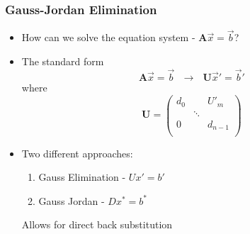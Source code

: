\documentclass[10pt]{beamer}
\begin{document}
\begin{frame}
  \frametitle{Gauss-Jordan Elimination}
  \begin{itemize}
  \item How can we solve the equation system - $\mathbf{A} \vec{x} = \vec{b}$?
  \pause
  \item The standard form
    \[
      \mathbf{A} \vec{x} = \vec{b} ~~~ \rightarrow ~~~ \mathbf{U} \vec{x}' = \vec{b}'
    \]
    where
    \[
      \mathbf{U} = \left(
        \begin{array}{ccc}
          d_0 & & U'_m\\
              & \ddots & \\
          0   &        & d_{n-1}\\
        \end{array}\right)
    \]
    \pause
  \item Two different approaches:
    \begin{enumerate}
    \item Gauss Elimination - $ U x' = b'$
    \item Gauss Jordan - $ D x^* = b^*$
    \end{enumerate}
    Allows for direct back substitution
  \end{itemize}
\end{frame}
\end{document}
